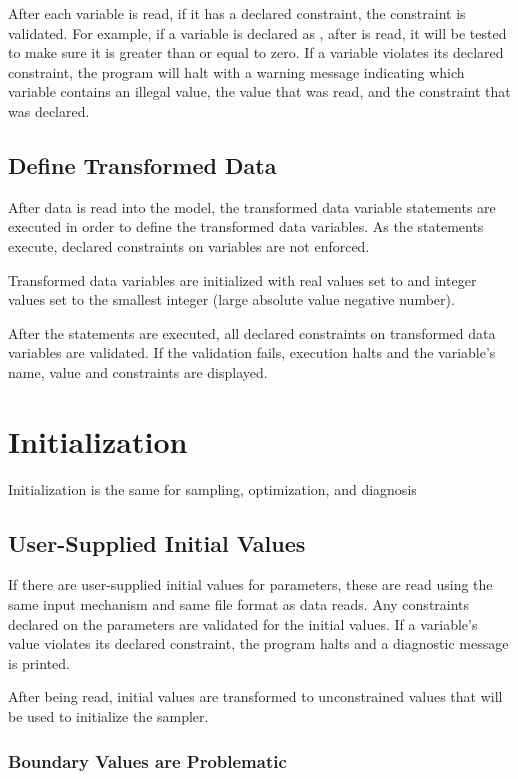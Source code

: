 After each variable is read, if it has a declared constraint, the
constraint is validated.  For example, if a variable  is
declared as , after  is read, it will be tested
to make sure it is greater than or equal to zero.  If a variable
violates its declared constraint, the program will halt with a warning
message indicating which variable contains an illegal value, the value
that was read, and the constraint that was declared.

\subsection{Define Transformed Data}

After data is read into the model, the transformed data variable
statements are executed in order to define the transformed data
variables.  As the statements execute, declared constraints on
variables are not enforced.

Transformed data variables are initialized with real values set to
 and integer values set to the smallest integer (large
absolute value negative number).

After the statements are executed, all declared constraints on
transformed data variables are validated.  If the validation fails,
execution halts and the variable's name, value and constraints are
displayed.

\section{Initialization}

Initialization is the same for sampling, optimization, and diagnosis

\subsection{User-Supplied Initial Values}

If there are user-supplied initial values for parameters, these are
read using the same input mechanism and same file format as data
reads.  Any constraints declared on the parameters are validated for
the initial values.  If a variable's value violates its declared
constraint, the program halts and a diagnostic message is printed.

After being read, initial values are transformed to unconstrained
values that will be used to initialize the sampler.

\subsubsection{Boundary Values are Problematic}

